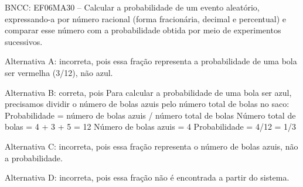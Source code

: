 BNCC: EF06MA30 -- Calcular a probabilidade de um evento aleatório,
expressando-a por número racional (forma fracionária, decimal e
percentual) e comparar esse número com a probabilidade obtida por meio
de experimentos sucessivos.

Alternativa A: incorreta, pois essa fração representa a probabilidade de
uma bola ser vermelha (3/12), não azul.

Alternativa B: correta, pois Para calcular a probabilidade de uma bola
ser azul, precisamos dividir o número de bolas azuis pelo número total
de bolas no saco: Probabilidade = número de bolas azuis / número total
de bolas Número total de bolas = 4 + 3 + 5 = 12 Número de bolas azuis =
4 Probabilidade = 4/12 = 1/3

Alternativa C: incorreta, pois essa fração representa o número de bolas
azuis, não a probabilidade.

Alternativa D: incorreta, pois essa fração não é encontrada a partir do
sistema.